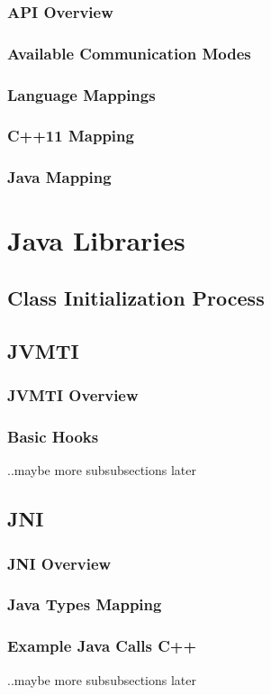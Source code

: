 \subsubsection{API Overview}
\subsubsection{Available Communication Modes}
\subsubsection{Language Mappings}
\subsubsection{C++11 Mapping}
\subsubsection{Java Mapping}

\section{Java Libraries}
\subsection{Class Initialization Process}
\subsection{JVMTI}
\subsubsection{JVMTI Overview}
\subsubsection{Basic Hooks}
..maybe more subsubsections later
\subsection{JNI}
\subsubsection{JNI Overview}
\subsubsection{Java Types Mapping}
\subsubsection{Example Java Calls  C++}
..maybe more subsubsections later
